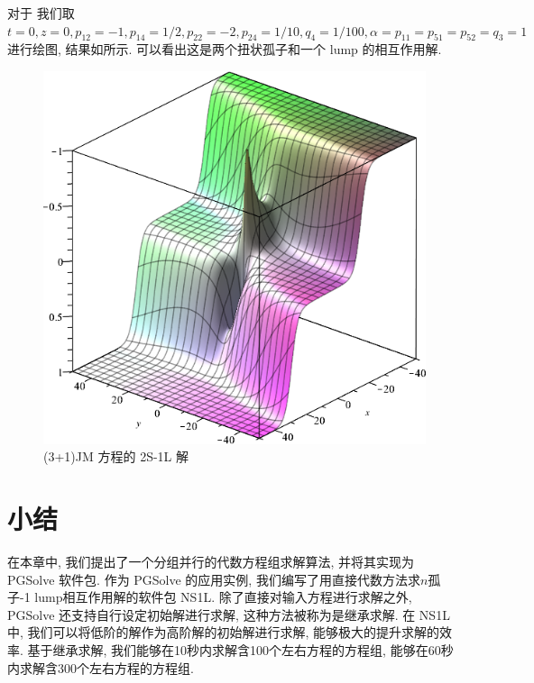 对于 我们取 $t=0,z=0,p_{12}=-1,p_{14}=1/2,p_{22}=-2,p_{24}=1/10,q_4=1/100,\alpha=p_{11}=p_{51}=p_{52}=q_3=1$进行绘图, 结果如所示. 可以看出这是两个扭状孤子和一个 lump 的相互作用解. 


\begin{figure}[H]
\centering
\includegraphics[width=.6\textwidth]{fig/2S1L.png}
\caption{(3+1)JM 方程的 2S-1L 解} \label{fig-2S1L}
\end{figure}

\section{小结}
在本章中, 我们提出了一个分组并行的代数方程组求解算法, 并将其实现为 PGSolve 软件包. 作为 PGSolve 的应用实例, 我们编写了用直接代数方法求$n$孤子-1 lump相互作用解的软件包 NS1L. 除了直接对输入方程进行求解之外, PGSolve 还支持自行设定初始解进行求解, 这种方法被称为是继承求解. 在 NS1L 中, 我们可以将低阶的解作为高阶解的初始解进行求解, 能够极大的提升求解的效率. 基于继承求解, 我们能够在10秒内求解含100个左右方程的方程组, 能够在60秒内求解含300个左右方程的方程组. 
 
